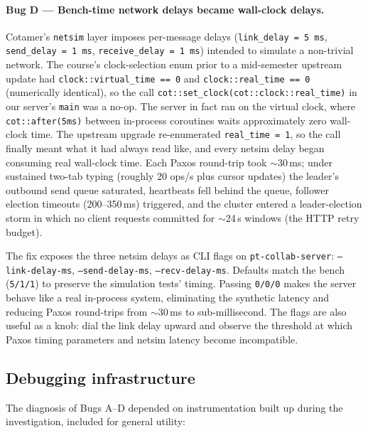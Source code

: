 \documentclass[11pt]{article}
\newcommand{\code}[1]{\texttt{#1}}
\begin{document}
\paragraph{Bug D --- Bench-time network delays became wall-clock delays.}
Cotamer's \code{netsim} layer imposes per-message delays (\code{link\_delay = 5\,ms}, \code{send\_delay = 1\,ms}, \code{receive\_delay = 1\,ms}) intended to simulate a non-trivial network. The course's clock-selection enum prior to a mid-semester upstream update had \code{clock::virtual\_time == 0} and \code{clock::real\_time == 0} (numerically identical), so the call \code{cot::set\_clock(cot::clock::real\_time)} in our server's \code{main} was a no-op. The server in fact ran on the virtual clock, where \code{cot::after(5ms)} between in-process coroutines waits approximately zero wall-clock time. The upstream upgrade re-enumerated \code{real\_time = 1}, so the call finally meant what it had always read like, and every netsim delay began consuming real wall-clock time. Each Paxos round-trip took $\sim$30\,ms; under sustained two-tab typing (roughly 20 ops/s plus cursor updates) the leader's outbound send queue saturated, heartbeats fell behind the queue, follower election timeouts (200--350\,ms) triggered, and the cluster entered a leader-election storm in which no client requests committed for $\sim$24\,s windows (the HTTP retry budget).

The fix exposes the three netsim delays as CLI flags on \code{pt-collab-server}: \code{--link-delay-ms}, \code{--send-delay-ms}, \code{--recv-delay-ms}. Defaults match the bench (\code{5/1/1}) to preserve the simulation tests' timing. Passing \code{0/0/0} makes the server behave like a real in-process system, eliminating the synthetic latency and reducing Paxos round-trips from $\sim$30\,ms to sub-millisecond. The flags are also useful as a knob: dial the link delay upward and observe the threshold at which Paxos timing parameters and netsim latency become incompatible.

\subsection{Debugging infrastructure}

The diagnosis of Bugs A--D depended on instrumentation built up during the investigation, included for general utility:
\end{document}
